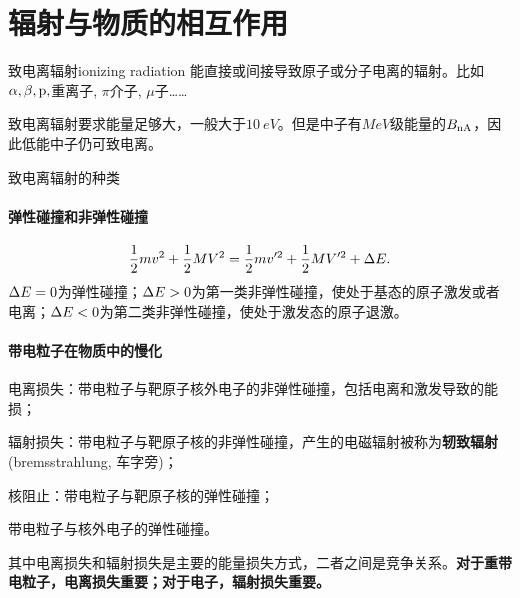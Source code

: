\section{辐射与物质的相互作用}
\begin{definition}{致电离辐射}{ionizing radiation}
	能直接或间接导致原子或分子电离的辐射。比如$\alpha,\beta,\mathrm p,$重离子, $\pi$介子, $\mu$子……
\end{definition}
致电离辐射要求能量足够大，一般大于$\SI{10}{eV}$。但是中子有$\si{MeV}$级能量的$B_{\mathrm n\mathrm{A}}$，因此低能中子仍可致电离。
\begin{center}
	\tikzchap 致电离辐射的种类
\end{center}
\paragraph{弹性碰撞和非弹性碰撞}
\[
	\frac12mv^2+\frac12MV^2=\frac12mv'^2+\frac12MV'^2+\Delta E.
\]
$\Delta E=0$为弹性碰撞；$\Delta E>0$为第一类非弹性碰撞，使处于基态的原子激发或者电离；$\Delta E<0$为第二类非弹性碰撞，使处于激发态的原子退激。
\paragraph{带电粒子在物质中的慢化}
\begin{compactenum}
	\item 电离损失：带电粒子与靶原子核外电子的非弹性碰撞，包括电离和激发导致的能损；
	\item 辐射损失：带电粒子与靶原子核的非弹性碰撞，产生的电磁辐射被称为\textbf{轫致辐射}(bremsstrahlung, 车字旁)；
	\item 核阻止：带电粒子与靶原子核的弹性碰撞；
	\item 带电粒子与核外电子的弹性碰撞。
\end{compactenum}
其中电离损失和辐射损失是主要的能量损失方式，二者之间是竞争关系。\textbf{对于重带电粒子，电离损失重要；对于电子，辐射损失重要。}
